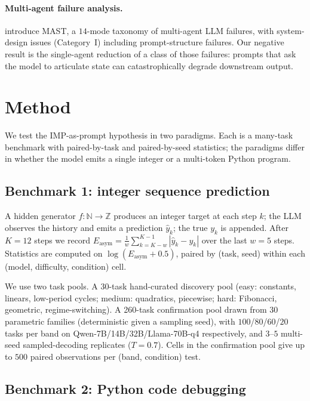 \documentclass{article}
\begin{document}
\paragraph{Multi-agent failure analysis.}
\citet{cemri2025why} introduce MAST, a $14$-mode taxonomy of
multi-agent LLM failures, with system-design issues
(Category~I) including prompt-structure failures.  Our negative
result is the single-agent reduction of a class of those
failures: prompts that ask the model to articulate state can
catastrophically degrade downstream output.

\section{Method}
\label{sec:method}

We test the IMP-as-prompt hypothesis in two paradigms.  Each is a
many-task benchmark with paired-by-task and paired-by-seed
statistics; the paradigms differ in whether the model emits a
single integer or a multi-token Python program.

\subsection{Benchmark 1: integer sequence prediction}
\label{sec:method-seq}

A hidden generator $f \colon \mathbb{N} \to \mathbb{Z}$ produces an
integer target at each step $k$; the LLM observes the history and
emits a prediction $\hat y_k$; the true $y_k$ is appended.  After
$K = 12$ steps we record $E_{\text{asym}} = \tfrac{1}{w}
\sum_{k=K-w}^{K-1} |\hat y_k - y_k|$ over the last $w = 5$ steps.
Statistics are computed on $\log(E_{\text{asym}} + 0.5)$, paired
by (task, seed) within each (model, difficulty, condition) cell.

We use two task pools.  A 30-task hand-curated discovery pool
(easy: constants, linears, low-period cycles; medium: quadratics,
piecewise; hard: Fibonacci, geometric, regime-switching).  A
260-task confirmation pool drawn from $30$ parametric families
(deterministic given a sampling seed), with $100$/$80$/$60$/$20$
tasks per band on Qwen-7B/14B/32B/Llama-70B-q4 respectively, and
$3$--$5$ multi-seed sampled-decoding replicates ($T = 0.7$).
Cells in the confirmation pool give up to $500$ paired
observations per (band, condition) test.

\subsection{Benchmark 2: Python code debugging}
\label{sec:method-code}
\end{document}
